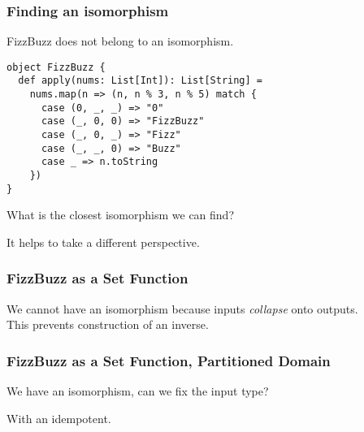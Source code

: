 \documentclass{beamer}
\begin{document}
\begin{frame}[fragile]
\frametitle{Finding an isomorphism}

FizzBuzz does not belong to an isomorphism.
\medskip

\begin{verbatim}
object FizzBuzz {
  def apply(nums: List[Int]): List[String] =
    nums.map(n => (n, n % 3, n % 5) match {
      case (0, _, _) => "0"
      case (_, 0, 0) => "FizzBuzz"
      case (_, 0, _) => "Fizz"
      case (_, _, 0) => "Buzz"
      case _ => n.toString
    })
}
\end{verbatim}

\pause
\medskip
What is the closest isomorphism we can find? \\
\medskip

It helps to take a different perspective.

\end{frame}

\begin{frame}[fragile]
\frametitle{FizzBuzz as a Set Function}
\medskip

We cannot have an isomorphism because inputs \emph{collapse} 
onto outputs. \\
This prevents construction of an inverse.
\end{frame}

\begin{frame}[fragile]
\frametitle{FizzBuzz as a Set Function, Partitioned Domain}
\medskip

We have an isomorphism, can we fix the input type? \\ \pause
\medskip

With an idempotent.
\end{frame}
\end{document}
